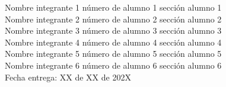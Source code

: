 \documentclass[letterpaper]{article}
\begin{document}
\vspace*{30mm}
\flushright 
	
Nombre integrante 1	número de alumno 1 sección alumno 1 \\
Nombre integrante 2	número de alumno 2 sección alumno 2\\
Nombre integrante 3	número de alumno 3 sección alumno 3\\
Nombre integrante 4	número de alumno 4 sección alumno 4\\
Nombre integrante 5	número de alumno 5 sección alumno 5\\
Nombre integrante 6 número de alumno 6 sección alumno 6\\

 
\vspace*{5mm}
{\large Fecha entrega: XX de XX de 202X\\}

\newpage
\begin{flushleft}
\tableofcontents
\end{flushleft}
\end{document}
